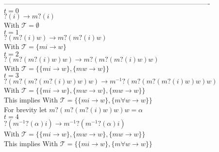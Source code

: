 \documentclass[12pt]{article}
\newcommand{\T}[0]{\mathcal{T}}
\newcommand{\arr}[0]{\rightarrow}
\begin{document}
-------------------------------------------------------------------------------------------\\


\noindent $t = 0$\\
$?(i) \arr m?(i)$\\
With ${\T} = \emptyset $\\

\noindent $t = 1$\\
$?(m?(i)w) \arr m?(m?(i)w)$\\
With ${\T} = \{mi \arr w \}$\\

\noindent $t = 2$\\
$?(m?(m?(i)w)w) \arr m?(m?(m?(i)w)w)$\\
With ${\T} = \{ \{mi \arr w\} , \{mw \arr w\} \}$\\

\noindent $t = 3$\\
$?(m?(m?(m?(i)w)w)w) \arr m^{-1}?(m?(m?(m?(i)w)w)w)$\\
With ${\T} = \{ \{mi \arr w\} , \{mw \arr w\}, \{mw \arr w\} \}$\\
This implies 
With ${\T} = \{ \{mi \arr w\} , \{m\forall w \arr w\}\}$\\

\noindent For brevity let $m?(m?(m?(i)w)w)w = \alpha$\\

\noindent $t = 4$\\
$?(m^{-1}?(\alpha)i) \arr m^{-1}?(m^{-1}?(\alpha)i) $\\
With ${\T} = \{ \{mi \arr w\} , \{mw \arr w\}, \{mw \arr w\} \}$\\
This implies 
With ${\T} = \{ \{mi \arr w\} , \{m\forall w \arr w\}\}$\\
\end{document}
